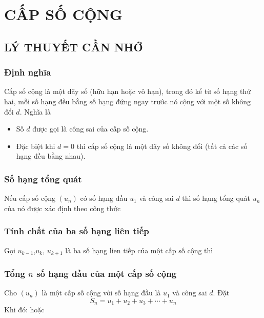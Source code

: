 \section{CẤP SỐ CỘNG}
\subsection{LÝ THUYẾT CẦN NHỚ}
\subsubsection{Định nghĩa}
Cấp số cộng là một dãy số (hữu hạn hoặc vô hạn), trong đó kể từ số hạng thứ hai, mỗi số hạng đều bằng số hạng đứng ngay trước nó cộng với một số không đổi $d.$ Nghĩa là
\begin{gachsoc}
	\begin{itemize}
		\item [$\bullet$] Số $d$ được gọi là công sai của cấp số cộng.
		\item [$\bullet$] Đặc biệt khi $d=0$ thì cấp số cộng là một dãy số không đổi (tất cả các số hạng đều bằng nhau).
	\end{itemize}
\end{gachsoc}
\subsubsection{Số hạng tổng quát}
	Nếu cấp số cộng $\left(u_n\right)$ có số hạng đầu $u_1$ và công sai $d$ thì số hạng tổng quát $u_n$ của nó được xác định theo công thức

\subsubsection{Tính chất của ba số hạng liên tiếp}
Gọi $u_{k-1}$,$u_{k}$, $u_{k+1}$ là ba số hạng lien tiếp của một cấp số cộng thì 

\subsubsection{Tổng $ n $ số hạng đầu của một cấp số cộng}
	Cho $(u_n)$ là một cấp số cộng với số hạng đầu là $u_1$ và công sai $d$. Đặt $${{S}_{n}}={{u}_{1}}+{{u}_{2}}+{{u}_{3}}+\cdots+{{u}_{n}}$$
	Khi đó:
	hoặc 
\newpage
